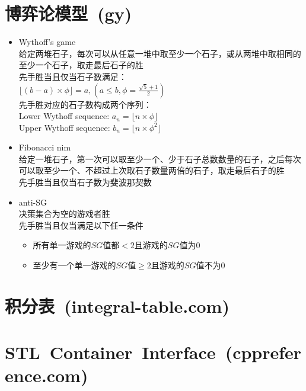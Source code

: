 \section{博弈论模型\ \small(gy)}
	\begin{itemize}
		\item Wythoff's game
			\\给定两堆石子，每次可以从任意一堆中取至少一个石子，或从两堆中取相同的至少一个石子，取走最后石子的胜
			\\先手胜当且仅当石子数满足：
			\\$\lfloor (b - a) \times \phi \rfloor=a, (a \leq b, \phi = \frac{\sqrt{5} + 1}{2})$
			\\先手胜对应的石子数构成两个序列：
			\\Lower Wythoff sequence: $a_n = \lfloor n \times \phi \rfloor$
			\\Upper Wythoff sequence: $b_n = \lfloor n \times \phi ^ 2 \rfloor$
		\item Fibonacci nim
			\\给定一堆石子，第一次可以取至少一个、少于石子总数数量的石子，之后每次可以取至少一个、不超过上次取石子数量两倍的石子，取走最后石子的胜
			\\先手胜当且仅当石子数为斐波那契数
		\item anti-SG
			\\决策集合为空的游戏者胜
			\\先手胜当且仅当满足以下任一条件
			\begin{itemize}[nosep]
				\item 所有单一游戏的$ SG $值都$ < 2 $且游戏的$ SG $值为$ 0 $
				\item 至少有一个单一游戏的$ SG $值$ \geq 2 $且游戏的$ SG $值不为$ 0 $
			\end{itemize}
	\end{itemize}
\section{积分表\ \small(integral-table.com)}
	\begin{multicols}{2}
		
	\end{multicols}
\section{STL\ Container\ Interface\ \small(cppreference.com)}
	\ifodd\thepage
		
	\else
		
	\fi